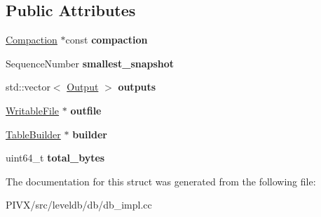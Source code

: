 \subsection*{Public Attributes}
\begin{DoxyCompactItemize}
\item 
\mbox{\label{structleveldb_1_1_d_b_impl_1_1_compaction_state_a6b92e9f2249d5977b4801bdf47afed28}} 
\mbox{\hyperlink{classleveldb_1_1_compaction}{Compaction}} $\ast$const {\bfseries compaction}
\item 
\mbox{\label{structleveldb_1_1_d_b_impl_1_1_compaction_state_a725f0984b8372c51691d72f66672dc89}} 
Sequence\+Number {\bfseries smallest\+\_\+snapshot}
\item 
\mbox{\label{structleveldb_1_1_d_b_impl_1_1_compaction_state_acce338739aafdfa40083ae3d5aacf24a}} 
std\+::vector$<$ \mbox{\hyperlink{structleveldb_1_1_d_b_impl_1_1_compaction_state_1_1_output}{Output}} $>$ {\bfseries outputs}
\item 
\mbox{\label{structleveldb_1_1_d_b_impl_1_1_compaction_state_a4c8e3de65efc30fdf33197d544a466f9}} 
\mbox{\hyperlink{classleveldb_1_1_writable_file}{Writable\+File}} $\ast$ {\bfseries outfile}
\item 
\mbox{\label{structleveldb_1_1_d_b_impl_1_1_compaction_state_a5335b9d45bc03378219e3fbc366fce21}} 
\mbox{\hyperlink{classleveldb_1_1_table_builder}{Table\+Builder}} $\ast$ {\bfseries builder}
\item 
\mbox{\label{structleveldb_1_1_d_b_impl_1_1_compaction_state_a21aa7304978dffc6841c4c11761f4b71}} 
uint64\+\_\+t {\bfseries total\+\_\+bytes}
\end{DoxyCompactItemize}


The documentation for this struct was generated from the following file\+:\begin{DoxyCompactItemize}
\item 
P\+I\+V\+X/src/leveldb/db/db\+\_\+impl.\+cc\end{DoxyCompactItemize}
